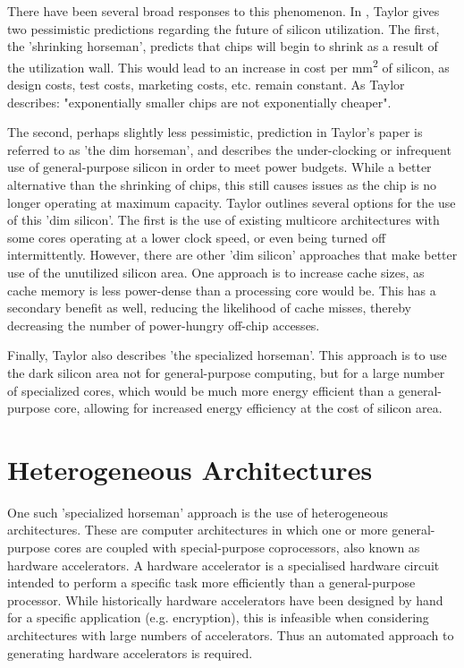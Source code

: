 \documentclass{UoYCSproject}
\begin{document}
There have been several broad responses to this phenomenon.
In \cite{four-horsemen}, Taylor gives two pessimistic predictions regarding the future of silicon
utilization. The first, the 'shrinking horseman', predicts that chips will begin to shrink as a result of
the utilization wall. This would lead to an increase in cost per mm\textsuperscript{2} of silicon, as
design costs, test costs, marketing costs, etc. remain constant. As Taylor describes: "exponentially smaller chips are not
exponentially cheaper".

The second, perhaps slightly less pessimistic, prediction in Taylor's paper
is referred to as 'the dim horseman', and describes the under-clocking or infrequent use of
general-purpose silicon in order to meet power budgets. While a better alternative than the shrinking
of chips, this still causes issues as the chip is no longer operating at maximum capacity.
Taylor outlines several options for the use of this 'dim silicon'. The first is the use of existing multicore architectures
with some cores operating at a lower clock speed, or even being turned off intermittently.
However, there are other 'dim silicon' approaches that make better
use of the unutilized silicon area. One approach is to increase cache sizes, as cache memory is less
power-dense than a processing core would be. This has a secondary benefit as well, reducing the likelihood of cache misses,
thereby decreasing the number of power-hungry off-chip accesses.

Finally, Taylor also describes 'the specialized horseman'. This approach is to use the dark silicon area
not for general-purpose computing, but for a large number of specialized cores, which would be much
more energy efficient than a general-purpose core, allowing for increased energy efficiency at the
cost of silicon area.

\section{Heterogeneous Architectures}

One such 'specialized horseman' approach is the use of heterogeneous architectures.
These are computer architectures in which one or more general-purpose cores are coupled with special-purpose coprocessors,
also known as hardware accelerators. A hardware accelerator is a specialised hardware circuit intended to perform a
specific task more efficiently than a general-purpose processor. While historically hardware accelerators have been designed by
hand for a specific application (e.g. encryption), this is infeasible when considering architectures
with large numbers of accelerators. Thus an automated approach to generating hardware accelerators is required.
\end{document}
